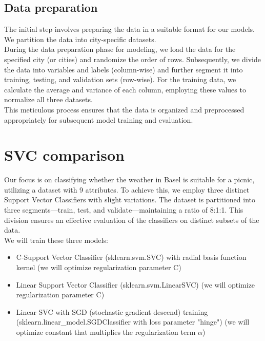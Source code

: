 \documentclass[a4paper]{article}
\begin{document}
	\subsection{Data preparation}
	
	The initial step involves preparing the data in a suitable format for our models. We partition the data into city-specific datasets.
	\\
	
	During the data preparation phase for modeling, we load the data for the specified city (or cities) and randomize the order of rows. Subsequently, we divide the data into variables and labels (column-wise) and further segment it into training, testing, and validation sets (row-wise). For the training data, we calculate the average and variance of each column, employing these values to normalize all three datasets.
	\\
	
	This meticulous process ensures that the data is organized and preprocessed appropriately for subsequent model training and evaluation.
	
	\newpage

	\section{SVC comparison}
	
	Our focus is on classifying whether the weather in Basel is suitable for a picnic, utilizing a dataset with 9 attributes. To achieve this, we employ three distinct Support Vector Classifiers with slight variations. The dataset is partitioned into three segments—train, test, and validate—maintaining a ratio of 8:1:1. This division ensures an effective evaluation of the classifiers on distinct subsets of the data. 
	\\
	
	We will train these three models:
	\begin{itemize}
		\item C-Support Vector Classifier (sklearn.svm.SVC) with radial basis function kernel (we will optimize regularization parameter C)
		\item Linear Support Vector Classifier (sklearn.svm.LinearSVC) (we will optimize regularization parameter C)
		\item Linear SVC with SGD (stochastic gradient descend) training (sklearn.linear\_model.SGDClassifier with loss parameter "hinge") (we will optimize constant that multiplies the regularization term $\alpha$)
	\end{itemize}
\end{document}
